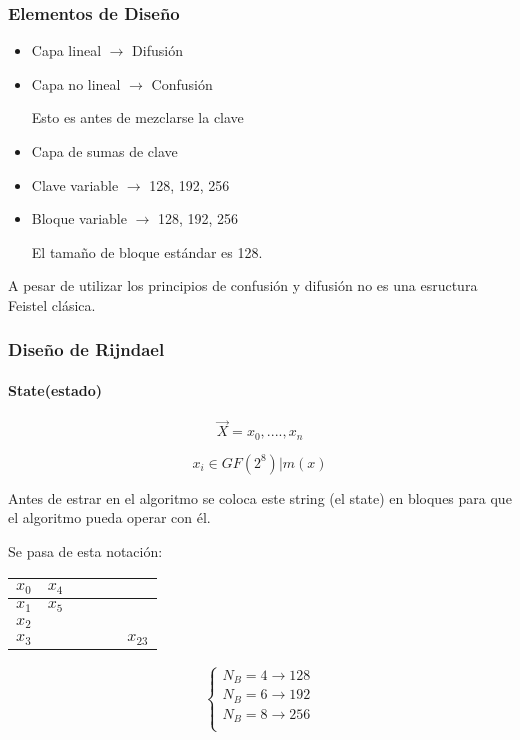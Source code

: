 \subsubsection{Elementos de Diseño}

\begin{itemize}
	\item Capa lineal $\rightarrow$ Difusión
	\item Capa no lineal $\rightarrow$ Confusión
	
	Esto es antes de mezclarse la clave
	\item Capa de sumas de clave
	\item Clave variable $\rightarrow$ 128, 192, 256
	\item Bloque variable $\rightarrow$ 128, 192, 256
	
	El tamaño de bloque estándar es 128.
\end{itemize}

A pesar de utilizar los principios de confusión y difusión no es una esructura Feistel clásica.
 
\subsubsection{Diseño de Rijndael}

\paragraph{State(estado)}

$$\overrightarrow{X} = x_0 , ...., x_n$$

$$x_i \in GF(2^8)|m(x)$$

Antes de estrar en el algoritmo se coloca este string (el state) en bloques para que el algoritmo pueda operar con él.


Se pasa de esta notación:

	\begin{center}
		\begin{tabular}{l | l | c | r | r | r}
			$x_0$ & $x_4$ &  &  &  &  \\
			\hline
			$x_1$  & $x_5$ &  &  &  &  \\
			\hline
			$x_2$  &  &  &  &  &  \\
			\hline
			$x_3$ &  &  &  &  & $x_{23}$ \\
		\end{tabular}
	\end{center}
	
	$$\begin{cases}
	N_B = 4 \rightarrow 128\\
	N_B = 6 \rightarrow 192\\
	N_B = 8 \rightarrow 256\\
	\end{cases}$$

